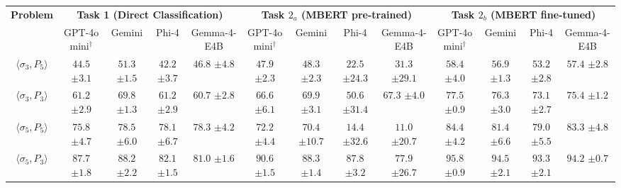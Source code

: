 \begin{table}[!htb]
\begin{adjustwidth}{-2.25in}{0in}
\begin{tabular}{c|cccc|cccc|cccc}
\hline
\multirow{2}{*}{\textbf{Problem}}
  & \multicolumn{4}{c|}{\textbf{Task 1 (Direct Classification)}}
  & \multicolumn{4}{c|}{\textbf{Task $2_a$ (MBERT pre-trained)}}
  & \multicolumn{4}{c}{\textbf{Task $2_b$ (MBERT fine-tuned)}}
\\
\cline{2-13}
  & \multicolumn{1}{c}{GPT-4o mini$^\dagger$}
  & \multicolumn{1}{c}{Gemini}
  & \multicolumn{1}{c}{Phi-4}
  & \multicolumn{1}{c|}{Gemma-4-E4B}
  & \multicolumn{1}{c}{GPT-4o mini$^\dagger$}
  & \multicolumn{1}{c}{Gemini}
  & \multicolumn{1}{c}{Phi-4}
  & \multicolumn{1}{c|}{Gemma-4-E4B}
  & \multicolumn{1}{c}{GPT-4o mini$^\dagger$}
  & \multicolumn{1}{c}{Gemini}
  & \multicolumn{1}{c}{Phi-4}
  & \multicolumn{1}{c}{Gemma-4-E4B}
\\
\hline
$\langle\sigma_3,P_5\rangle$
  & $44.5$ \scriptsize $\pm 3.1$
  & $\mathbf{51.3}$ \scriptsize $\pm 1.5$
  & $42.2$ \scriptsize $\pm 3.7$
  & $46.8$ \scriptsize $\pm 4.8$
  & $47.9$ \scriptsize $\pm 2.3$
  & $48.3$ \scriptsize $\pm 2.3$
  & $22.5$ \scriptsize $\pm 24.3$
  & $31.3$ \scriptsize $\pm 29.1$
  & \underline{$58.4$} \scriptsize $\pm 4.0$
  & $56.9$ \scriptsize $\pm 1.3$
  & $53.2$ \scriptsize $\pm 2.8$
  & $57.4$ \scriptsize $\pm 2.8$
\\\hline
$\langle\sigma_3,P_3\rangle$
  & $61.2$ \scriptsize $\pm 2.9$
  & $\mathbf{69.8}$ \scriptsize $\pm 1.3$
  & $61.2$ \scriptsize $\pm 2.9$
  & $60.7$ \scriptsize $\pm 2.8$
  & $66.6$ \scriptsize $\pm 6.1$
  & $69.9$ \scriptsize $\pm 3.1$
  & $50.6$ \scriptsize $\pm 31.4$
  & $67.3$ \scriptsize $\pm 4.0$
  & \underline{$77.5$} \scriptsize $\pm 0.9$
  & $76.3$ \scriptsize $\pm 3.0$
  & $73.1$ \scriptsize $\pm 2.7$
  & $75.4$ \scriptsize $\pm 1.2$
\\\hline
$\langle\sigma_5,P_5\rangle$
  & $75.8$ \scriptsize $\pm 4.7$
  & $\mathbf{78.5}$ \scriptsize $\pm 6.0$
  & $78.1$ \scriptsize $\pm 6.7$
  & $78.3$ \scriptsize $\pm 4.2$
  & $72.2$ \scriptsize $\pm 4.4$
  & $70.4$ \scriptsize $\pm 10.7$
  & $14.4$ \scriptsize $\pm 32.6$
  & $11.0$ \scriptsize $\pm 20.7$
  & \underline{$84.4$} \scriptsize $\pm 4.2$
  & $81.4$ \scriptsize $\pm 6.6$
  & $79.0$ \scriptsize $\pm 5.5$
  & $83.3$ \scriptsize $\pm 4.8$
\\\hline
$\langle\sigma_5,P_3\rangle$
  & $87.7$ \scriptsize $\pm 1.8$
  & $\mathbf{88.2}$ \scriptsize $\pm 2.2$
  & $82.1$ \scriptsize $\pm 1.5$
  & $81.0$ \scriptsize $\pm 1.6$
  & $90.6$ \scriptsize $\pm 1.5$
  & $88.3$ \scriptsize $\pm 1.4$
  & $87.8$ \scriptsize $\pm 3.2$
  & $77.9$ \scriptsize $\pm 26.7$
  & \underline{$95.8$} \scriptsize $\pm 0.9$
  & $94.5$ \scriptsize $\pm 2.1$
  & $93.3$ \scriptsize $\pm 2.1$
  & $94.2$ \scriptsize $\pm 0.7$
\\\hline
\end{tabular}
\label{tab:extendedMLLMbenchmark}
\end{adjustwidth}
\end{table}


